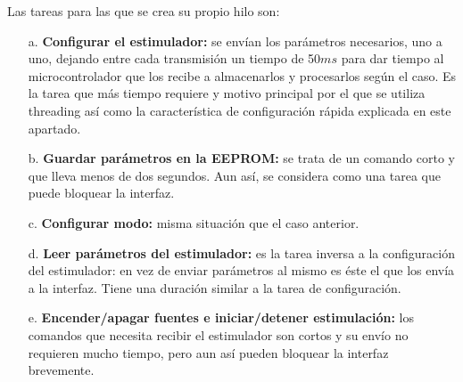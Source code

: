 \begin{itemize}
Las tareas para las que se crea su propio hilo son:

\begin{itemize}
\item[a.] \textbf{Configurar el estimulador:} se envían los parámetros necesarios, uno a uno, dejando entre cada transmisión un tiempo de 50$ms$ para dar tiempo al microcontrolador que los recibe a almacenarlos y procesarlos según el caso. Es la tarea que más tiempo requiere y motivo principal por el que se utiliza threading así como la característica de configuración rápida explicada en este apartado.
\item[b.] \textbf{Guardar parámetros en la EEPROM:} se trata de un comando corto y que lleva menos de dos segundos. Aun así, se considera como una tarea que puede bloquear la interfaz.
\item[c.] \textbf{Configurar modo:} misma situación que el caso anterior.
\item[d.] \textbf{Leer parámetros del estimulador:} es la tarea inversa a la configuración del estimulador: en vez de enviar parámetros al mismo es éste el que los envía a la interfaz. Tiene una duración similar a la tarea de configuración.
\item[e.] \textbf{Encender/apagar fuentes e iniciar/detener estimulación:} los comandos que necesita recibir el estimulador son cortos y su envío no requieren mucho tiempo, pero aun así pueden bloquear la interfaz brevemente.
\end{itemize}
\end{itemize}





















